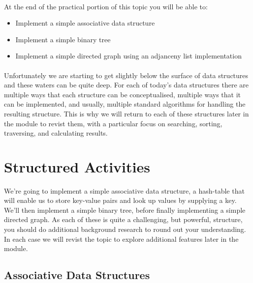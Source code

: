 \documentclass[10pt, a4paper, twosize]{article}
\begin{document}
\paragraph{} At the end of the practical portion of this topic you will be able to:

\begin{itemize}
\item Implement a simple associative data structure
\item Implement a simple binary tree
\item Implement a simple directed graph using an adjanceny list implementation
\end{itemize}

\paragraph{} Unfortunately we are starting to get slightly below the surface of data structures and these waters can be quite deep. For each of today's data structures there are multiple ways that each structure can be conceptualised, multiple ways that it can be implemented, and usually, multiple standard algorithms for handling the resulting structure. This is why we will return to each of these structures later in the module to revist them, with a particular focus on searching, sorting, traversing, and calculating results.
\section{Structured Activities}

\paragraph{} We're going to implement a simple associative data structure, a hash-table that will enable us to store key-value pairs and look up values by supplying a key. We'll then implement a simple binary tree, before finally implementing a simple directed graph. As each of these is quite a challenging, but powerful, structure, you should do additional background research to round out your understanding. In each case we will revist the topic to explore additional features later in the module.

\subsection{Associative Data Structures}
\end{document}
